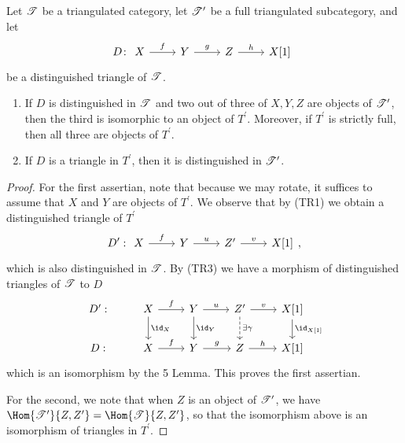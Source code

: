 \documentclass[10pt]{amsart}
\begin{document}
\begin{prop}\label{fulltriangles}
  Let $\mathscr{T}$ be a triangulated category, let $\mathscr{T}^\prime$ be a full triangulated subcategory, and let 
  $$D\colon 
  \begin{tikzcd}
    X \arrow{r}{f} & Y \arrow{r}{g} & Z \arrow{r}{h} & X[1] 
  \end{tikzcd}$$
  be a distinguished triangle of $\mathscr{T}$.
  \begin{enumerate}
  \item
    If $D$ is distinguished in $\mathscr{T}$ and two out of three of $X,Y,Z$ are objects of $\mathscr{T}^\prime$, then the third is isomorphic to an object of $T^\prime$.
    Moreover, if $T^\prime$ is strictly full, then all three are objects of $T^\prime$.
  \item
    If $D$ is a triangle in $T^\prime$, then it is distinguished in $\mathscr{T}^\prime$.
  \end{enumerate}

  \begin{proof}
    For the first assertian, note that because we may rotate, it suffices to assume that $X$ and $Y$ are objects of $T^\prime$.
    We observe that by (TR1) we obtain a distinguished triangle of $T^\prime$ 
    $$D^\prime : 
    \begin{tikzcd}
      X \arrow{r}{f} & Y\arrow{r}{u} & Z^\prime \arrow{r}{v} & X[1]
    \end{tikzcd},$$
    which is also distinguished in $\mathscr{T}$.
    By (TR3) we have a morphism of distinguished triangles of $\mathscr{T}$ to $D$
    $$\begin{tikzcd}
      D^\prime: & X \arrow{d}{\id_X}\arrow{r}{f} & Y \arrow{d}{\id_Y}\arrow{r}{u} & Z^\prime \arrow[dashed]{d}{\exists \gamma}\arrow{r}{v} & X[1]\arrow{d}{\id_{X[1]}}\\
      D: & X \arrow{r}{f} & Y \arrow{r}{g} & Z \arrow{r}{h} & X[1]
    \end{tikzcd}$$
    which is an isomorphism by the 5 Lemma.
    This proves the first assertian.
    
    For the second, we note that when $Z$ is an object of $\mathscr{T}^\prime$, we have $\Hom{\T^\prime}{Z,Z^\prime} = \Hom{\T}{Z,Z^\prime}$, so that the isomorphism above is an isomorphism of triangles in $T^\prime$.
  \end{proof}
\end{prop}
\end{document}
